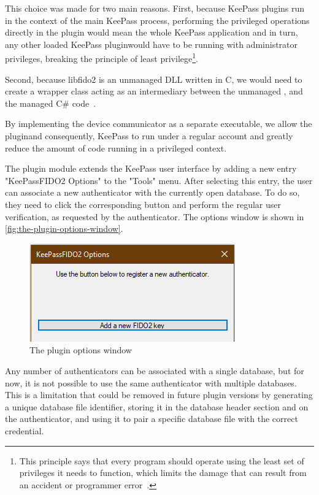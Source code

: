 This choice was made for two main reasons. First, because KeePass plugins run in the context of the main KeePass process,
performing the privileged operations directly in the plugin would mean the whole KeePass application
\textemdash and in turn, any other loaded KeePass plugin\textemdash would have to be running with
administrator privileges, breaking the principle of least privilege\footnote{
	This principle says that every program should operate using the least set of privileges it needs to function,
	which limits the damage that can result from an accident or programmer error~\cite{the-protection-of-information}.
}.

Second, because libfido2 is an unmanaged DLL written in C, we would need to create a wrapper class acting as an
intermediary between the unmanaged , and the managed C\# code~\cite{microsoft:unmanaged-dll}.

By implementing the device communicator as a separate executable, we allow the plugin\textemdash and consequently, KeePass
\textemdash to run under a regular account and greatly reduce the amount of code running in a privileged context.

The plugin module extends the KeePass user interface by adding a new entry "KeePassFIDO2 Options" to the "Tools" menu. After selecting this entry,
the user can associate a new authenticator with the currently open database. To do so, they need to click the corresponding button
and perform the regular user verification, as requested by the authenticator. The options window is shown in \autoref{fig:the-plugin-options-window}.

\begin{figure}[H]
	\centering\includegraphics[width=.75\textwidth]{images/plugin-options}
	\caption{The plugin options window}
	\label{fig:the-plugin-options-window}
\end{figure}

Any number of authenticators can be associated with a single database, but for now, it is not possible
to use the same authenticator with multiple databases. This is a limitation that could be removed in future
plugin versions by generating a unique database file identifier, storing it in the database header section
and on the authenticator, and using it to pair a specific database file with the correct credential.

